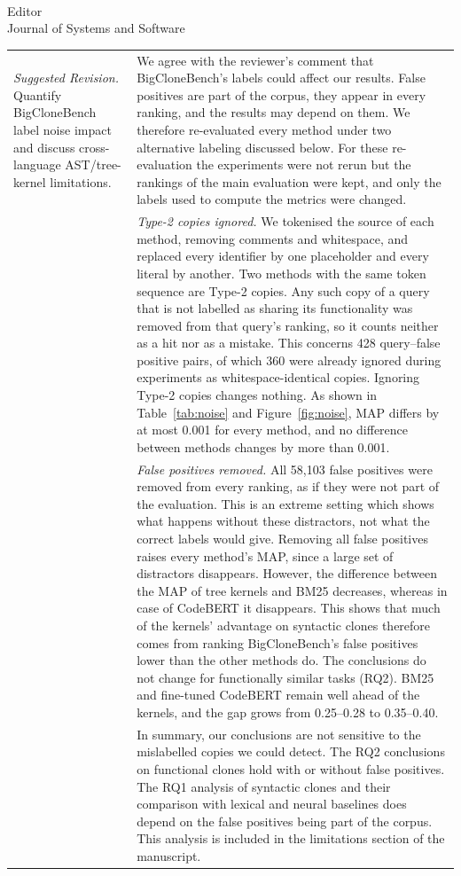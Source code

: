 \documentclass[
pagenumber=false, %
parskip=half, %
fromalign=right, %
foldmarks=false, %
addrfield=false %
]{scrlttr2}
\begin{document}
\begin{letter}{\\Editor\\Journal of Systems and Software}
\begin{longtable}{p{}p{}}
		 	\textit{Suggested Revision.} Quantify BigCloneBench label noise impact and discuss cross-language AST/tree-kernel limitations. & We agree with the reviewer's comment that BigCloneBench's labels could affect our results. False positives are part of the corpus, they appear in every ranking, and the results may depend on them. 
		 	We therefore re-evaluated every method under two alternative labeling discussed below. For these re-evaluation the experiments were not rerun but the rankings of the
		 	main evaluation were kept, and only the labels used to compute the metrics were changed. \\
		 	 & \emph{Type-2 copies ignored.} We tokenised the source of each method, removing comments and whitespace, and replaced every identifier by one placeholder and every literal by another. Two methods with the same token sequence are Type-2 copies. Any such copy of a query that is not labelled as sharing its functionality was removed from that query's ranking, so it counts neither as a hit nor as a mistake. This concerns 428 query--false positive pairs, of which 360 were already ignored during experiments as whitespace-identical copies. 
		 	Ignoring Type-2 copies changes nothing. As shown in Table~\ref{tab:noise} and  Figure~\ref{fig:noise}, MAP differs by at most 0.001 for every method, and no difference between methods changes by more than 0.001. \\
		 	 & \emph{False positives removed.} All 58,103 false positives were removed from every ranking, as if they were not part of the evaluation. This is an extreme setting which shows what happens without these distractors, not what the correct labels would give. Removing all false positives raises every method's MAP, since a large set of distractors disappears.
		 	However, the difference between the MAP of tree kernels and BM25 decreases, whereas in case of CodeBERT it disappears. This shows that much of the kernels' advantage on syntactic clones therefore comes from ranking BigCloneBench's false
		 	positives lower than the other methods do. The conclusions do not change for functionally similar tasks (RQ2). BM25 and fine-tuned
		 	CodeBERT remain well ahead of the kernels, and the gap grows from 0.25--0.28 to 0.35--0.40. \\
		 	
		 	 & In summary, our conclusions are not sensitive to the mislabelled copies we could detect. The RQ2 conclusions on functional clones hold with or without false positives. The RQ1 analysis of syntactic clones and their comparison with lexical and neural baselines does depend on the false positives being part of the corpus. This analysis is included in the limitations section of the manuscript.\\
		 	

\end{longtable}
\end{letter}
\end{document}
